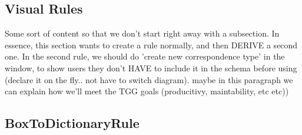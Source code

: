 \newpage
\hypertarget{rules vis}{}
\subsection{Visual Rules}
\visHeader

Some sort of content so that we don't start right away with a subsection. In essence, this section wants to create a rule normally, and then DERIVE a second
one. In the second rule, we should do 'create new correspondence type' in the window, to show users they don't HAVE to include it in the schema before using
(declare it on the fly.. not have to switch diagram). maybe in this paragraph we can explain how we'll meet the TGG goals (producitivy, maintability, etc etc))

\subsection{BoxToDictionaryRule}

